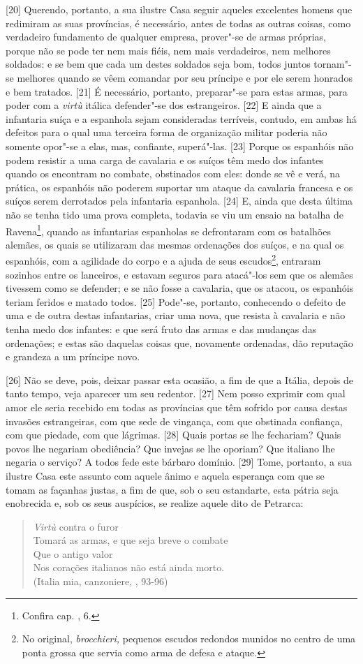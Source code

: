 {[}20{]} Querendo, portanto, a sua ilustre Casa seguir aqueles
excelentes homens que redimiram as suas províncias, é necessário, antes
de todas as outras coisas, como verdadeiro fundamento de qualquer
empresa, prover"-se de armas próprias, porque não se pode ter nem mais
fiéis, nem mais verdadeiros, nem melhores soldados: e se bem que cada um
destes soldados seja bom, todos juntos tornam"-se melhores quando se vêem
comandar por seu príncipe e por ele serem honrados e bem tratados.
{[}21{]} É necessário, portanto, preparar"-se para estas armas, para
poder com a \emph{virtù} itálica defender"-se dos estrangeiros. {[}22{]}
E ainda que a infantaria suíça e a espanhola sejam consideradas
terríveis, contudo, em ambas há defeitos para o qual uma terceira forma
de organização militar poderia não somente opor"-se a elas, mas,
confiante, superá"-las. {[}23{]} Porque os espanhóis não podem resistir a
uma carga de cavalaria e os suíços têm medo dos infantes quando os
encontram no combate, obstinados com eles: donde se vê e verá, na
prática, os espanhóis não poderem suportar um ataque da cavalaria
francesa e os suíços serem derrotados pela infantaria espanhola.
{[}24{]} E, ainda que desta última não se tenha tido uma prova completa,
todavia se viu um ensaio na batalha de Ravena\footnote{Confira cap. ,
  6.}, quando as infantarias espanholas se defrontaram com os batalhões
alemães, os quais se utilizaram das mesmas ordenações dos suíços, e na
qual os espanhóis, com a agilidade do corpo e a ajuda de seus
escudos\footnote{No original, \emph{brocchieri,} pequenos escudos
  redondos munidos no centro de uma ponta grossa que servia como arma de
  defesa e ataque.}, entraram sozinhos entre os lanceiros, e estavam
seguros para atacá"-los sem que os alemães tivessem como se defender; e
se não fosse a cavalaria, que os atacou, os espanhóis teriam feridos e
matado todos. {[}25{]} Pode"-se, portanto, conhecendo o defeito de uma e
de outra destas infantarias, criar uma nova, que resista à cavalaria e
não tenha medo dos infantes: e que será fruto das armas e das mudanças
das ordenações; e estas são daquelas coisas que, novamente ordenadas,
dão reputação e grandeza a um príncipe novo.

{[}26{]} Não se deve, pois, deixar passar esta ocasião, a fim de que a
Itália, depois de tanto tempo, veja aparecer um seu redentor. {[}27{]}
Nem posso exprimir com qual amor ele seria recebido em todas as
províncias que têm sofrido por causa destas invasões estrangeiras, com
que sede de vingança, com que obstinada confiança, com que piedade, com
que lágrimas. {[}28{]} Quais portas se lhe fechariam? Quais povos lhe
negariam obediência? Que invejas se lhe oporiam? Que italiano lhe
negaria o serviço? A todos fede este bárbaro domínio. {[}29{]} Tome,
portanto, a sua ilustre Casa este assunto com aquele ânimo e aquela
esperança com que se tomam as façanhas justas, a fim de que, sob o seu
estandarte, esta pátria seja enobrecida e, sob os seus auspícios, se
realize aquele dito de Petrarca:

\begin{verse}
\emph{Virtù} contra o furor\\
Tomará as armas, e que seja breve o combate\\
Que o antigo valor\\
Nos corações italianos não está ainda morto.\\
(Italia mia, canzoniere, , 93-96)
\end{verse}